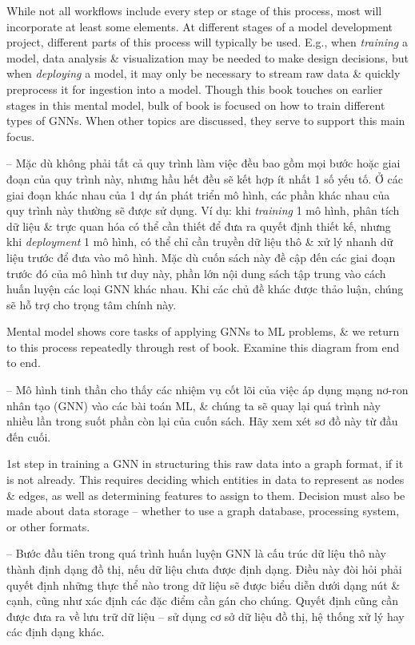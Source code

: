\documentclass{article}
\begin{document}
\begin{itemize}
\begin{itemize}
\begin{itemize}
            While not all workflows include every step or stage of this process, most will incorporate at least some elements. At different stages of a model development project, different parts of this process will typically be used. E.g., when {\it training} a model, data analysis \& visualization may be needed to make design decisions, but when {\it deploying} a model, it may only be necessary to stream raw data \& quickly preprocess it for ingestion into a model. Though this book touches on earlier stages in this mental model, bulk of book is focused on how to train different types of GNNs. When other topics are discussed, they serve to support this main focus.

            -- Mặc dù không phải tất cả quy trình làm việc đều bao gồm mọi bước hoặc giai đoạn của quy trình này, nhưng hầu hết đều sẽ kết hợp ít nhất 1 số yếu tố. Ở các giai đoạn khác nhau của 1 dự án phát triển mô hình, các phần khác nhau của quy trình này thường sẽ được sử dụng. Ví dụ: khi {\it training} 1 mô hình, phân tích dữ liệu \& trực quan hóa có thể cần thiết để đưa ra quyết định thiết kế, nhưng khi {\it deployment} 1 mô hình, có thể chỉ cần truyền dữ liệu thô \& xử lý nhanh dữ liệu trước để đưa vào mô hình. Mặc dù cuốn sách này đề cập đến các giai đoạn trước đó của mô hình tư duy này, phần lớn nội dung sách tập trung vào cách huấn luyện các loại GNN khác nhau. Khi các chủ đề khác được thảo luận, chúng sẽ hỗ trợ cho trọng tâm chính này.

            Mental model shows core tasks of applying GNNs to ML problems, \& we return to this process repeatedly through rest of book. Examine this diagram from end to end.

            -- Mô hình tinh thần cho thấy các nhiệm vụ cốt lõi của việc áp dụng mạng nơ-ron nhân tạo (GNN) vào các bài toán ML, \& chúng ta sẽ quay lại quá trình này nhiều lần trong suốt phần còn lại của cuốn sách. Hãy xem xét sơ đồ này từ đầu đến cuối.

            1st step in training a GNN in structuring this raw data into a graph format, if it is not already. This requires deciding which entities in data to represent as nodes \& edges, as well as determining features to assign to them. Decision must also be made about data storage -- whether to use a graph database, processing system, or other formats.

            -- Bước đầu tiên trong quá trình huấn luyện GNN là cấu trúc dữ liệu thô này thành định dạng đồ thị, nếu dữ liệu chưa được định dạng. Điều này đòi hỏi phải quyết định những thực thể nào trong dữ liệu sẽ được biểu diễn dưới dạng nút \& cạnh, cũng như xác định các đặc điểm cần gán cho chúng. Quyết định cũng cần được đưa ra về lưu trữ dữ liệu -- sử dụng cơ sở dữ liệu đồ thị, hệ thống xử lý hay các định dạng khác.


\end{itemize}
\end{itemize}
\end{itemize}
\end{document}
